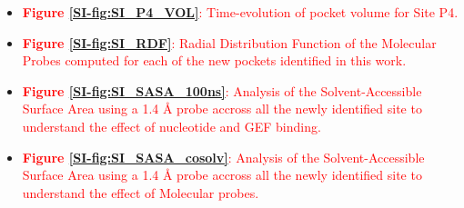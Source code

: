\documentclass[12pt,a4paper]{achemso}
\begin{document}
\begin{suppinfo}
\begin{itemize}
    \item \textcolor{red}{\textbf{Figure \ref{SI-fig:SI_P4_VOL}}: Time-evolution of pocket volume for Site P4.}
    \item \textcolor{red}{\textbf{Figure \ref{SI-fig:SI_RDF}}: Radial Distribution Function of the Molecular Probes computed for each of the new pockets identified in this work.}
    \item \textcolor{red}{\textbf{Figure \ref{SI-fig:SI_SASA_100ns}}: Analysis of the Solvent-Accessible Surface Area using a 1.4 \r{A} probe accross all the newly identified site to understand the effect of nucleotide and GEF binding.}
    \item \textcolor{red}{\textbf{Figure \ref{SI-fig:SI_SASA_cosolv}}: Analysis of the Solvent-Accessible Surface Area using a 1.4 \r{A} probe accross all the newly identified site to understand the effect of Molecular probes.}

\end{itemize}
\end{suppinfo}

 
\end{document}
